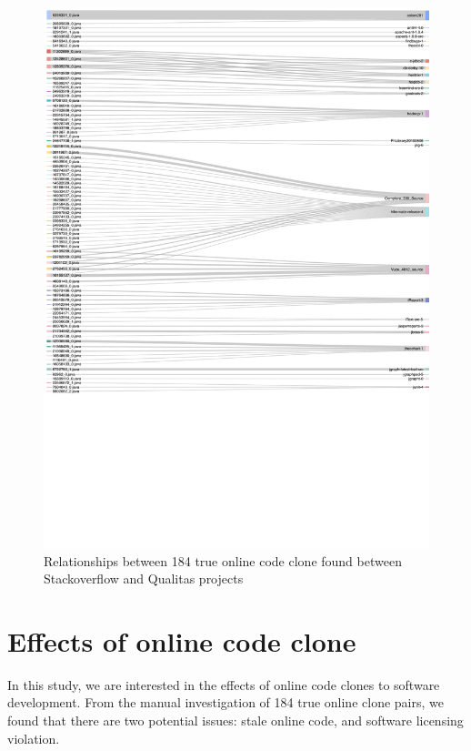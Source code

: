 \documentclass{sig-alternate-05-2015}
\begin{document}
\begin{figure}
	\centering
	\includegraphics[width=1\linewidth]{Sankey_proj}
	\caption{Relationships between 184 true online code clone found between Stackoverflow and Qualitas projects}
	\label{fig:sankey}
\end{figure}


\section{Effects of online code clone}

In this study, we are interested in the effects of online code clones to software development. From the manual investigation of 184 true online clone pairs, we found that there are two potential issues: stale online code, and software licensing violation.
\end{document}

